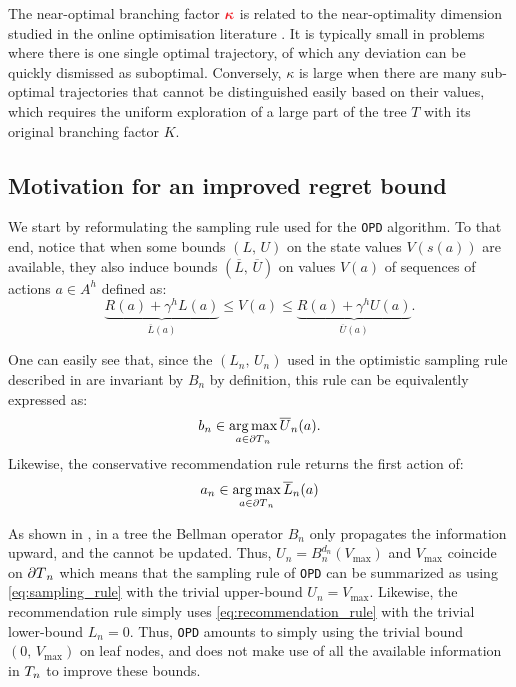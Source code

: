 \documentclass[runningheads]{llncs}
\begin{document}
The near-optimal branching factor $\hlrb{\kappa}$ is related \citep{Bubeck2010open} to the near-optimality dimension studied in the online optimisation literature \citep[see e.g.][]{DOO HOO SOO POO}. 
It is typically small in problems where there is one single optimal trajectory, of which any deviation can be quickly dismissed as suboptimal. Conversely, $\kappa$ is large when there are many sub-optimal trajectories that cannot be distinguished easily based on their values, which requires the uniform exploration of a large part of the tree $T$ with its original branching factor $K$. 


\subsection{Motivation for an improved regret bound}

We start by reformulating the sampling rule used for the \texttt{OPD} algorithm. To that end, notice that when some bounds $(L,\,U)$ on the state values $V(s(a))$ are available, they also induce bounds $(\overline{L},\, \overline{U})$ on values $V(a)$ of sequences of actions $a\in A^h$ defined as:
\begin{equation*}
\underbrace{R(a) + \gamma^{h} L(a)}_{\overline{L}(a)} \leq V(a) \leq \underbrace{R(a) + \gamma^{h} U(a)}_{\overline{U}(a)}.
\end{equation*}

One can easily see that, since the $(L_n,\,U_n)$ used in the optimistic sampling rule described in  are invariant by $B_n$ by definition, this rule can be equivalently expressed as:
\begin{equation}
\label{eq:sampling_rule}
b_n \in \operatorname*{arg\,max}_{a\in{\partial T}_n} \overline{U}_n(a).
\end{equation}
Likewise, the conservative recommendation rule returns the first action of:
\begin{equation}
\label{eq:recommendation_rule}
a_n \in \operatorname*{arg\,max}_{a\in{\partial T}_n} \overline{L}_n(a)
\end{equation}


As shown in , in a tree the Bellman operator $B_n$ only propagates the information upward, and the  cannot be updated. Thus, $U_n = B_n^{d_n}(V_{\max})$ and $V_{\max}$ coincide on ${\partial T}_n$ which means that the sampling rule of \texttt{OPD} can be summarized as using \eqref{eq:sampling_rule} with the trivial upper-bound $U_n = V_{\max}$.
Likewise, the recommendation rule simply uses \eqref{eq:recommendation_rule} with the trivial lower-bound $L_n = 0$. Thus, \texttt{OPD} amounts to simply using the trivial bound $(0,\, V_{\max})$ on leaf nodes, and does not make use of all the available information in $T_n$ to improve these bounds.
\end{document}
